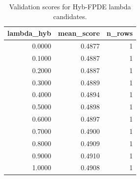 \begin{table}[t]
\caption{Validation scores for Hyb-FPDE lambda candidates.}
\label{tab:lambda_distribution_computed}
\centering
\begin{tabular}{rrr}
\toprule
lambda\_hyb & mean\_score & n\_rows \\
\midrule
0.0000 & 0.4877 & 1 \\
0.1000 & 0.4887 & 1 \\
0.2000 & 0.4887 & 1 \\
0.3000 & 0.4889 & 1 \\
0.4000 & 0.4894 & 1 \\
0.5000 & 0.4898 & 1 \\
0.6000 & 0.4897 & 1 \\
0.7000 & 0.4900 & 1 \\
0.8000 & 0.4909 & 1 \\
0.9000 & 0.4910 & 1 \\
1.0000 & 0.4908 & 1 \\
\bottomrule
\end{tabular}

\end{table}
